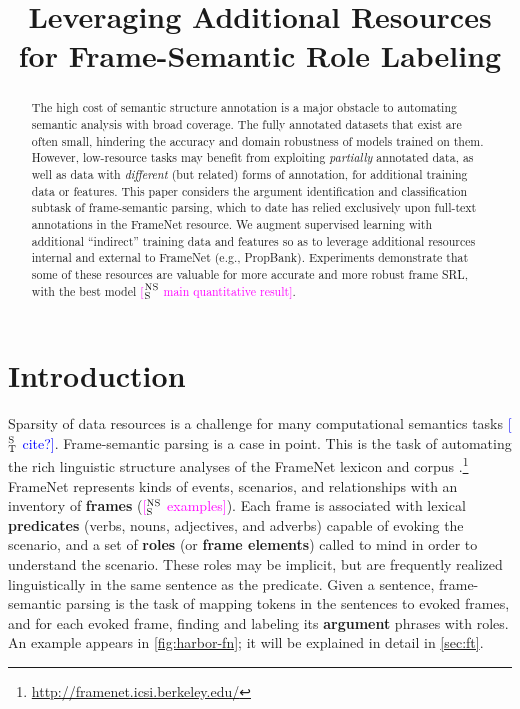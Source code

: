 \documentclass[11pt,a4paper]{article}
\title{Leveraging Additional Resources for Frame-Semantic Role Labeling}
\date{}
\newcommand{\ensuretext}[1]{#1}
\newcommand{\nssmarker}{\ensuretext{\textcolor{magenta}{\ensuremath{^{\textsc{NS}}_{\textsc{S}}}}}}
\newcommand{\stmarker}{\ensuretext{\textcolor{blue}{\ensuremath{^{\textsc{S}}_{\textsc{T}}}}}}
\newcommand{\arkcomment}[3]{\ensuretext{\textcolor{#3}{[#1 #2]}}}
\newcommand{\nss}[1]{\arkcomment{\nssmarker}{#1}{magenta}}
\newcommand{\st}[1]{\arkcomment{\stmarker}{#1}{blue}}
\begin{document}
\maketitle
\begin{abstract}
The high cost of semantic structure annotation is a major obstacle 
to automating semantic analysis with broad coverage.
The fully annotated datasets that exist are often small, 
hindering the accuracy and domain robustness of models trained on them.
However, low-resource tasks may benefit from exploiting \emph{partially} annotated data, 
as well as data with \emph{different} (but related) forms of annotation,
for additional training data or features.
This paper considers the argument identification and classification subtask 
of frame-semantic parsing, which to date has relied exclusively 
upon full-text annotations in the FrameNet resource. %
We augment supervised learning with additional 
``indirect'' training data and features 
so as to leverage additional resources internal and external to FrameNet (e.g., PropBank). 
Experiments demonstrate that some of these resources are valuable for 
more accurate and more robust frame SRL,
with the best model \nss{main quantitative result}.
\end{abstract}

\section{Introduction}

Sparsity of data resources is a challenge for many computational semantics tasks \st{cite?}.
Frame-semantic parsing \citep{das-14} is a case in point.
This is the task of automating the rich linguistic structure analyses 
of the FrameNet lexicon and corpus \citep{baker-98}.\footnote{\url{http://framenet.icsi.berkeley.edu/}}
FrameNet represents kinds of events, scenarios, and relationships 
with an inventory of \textbf{frames} (\nss{examples}). 
Each frame is associated with lexical \textbf{predicates} (verbs, nouns, adjectives, and adverbs) capable of 
evoking the scenario, and a set of \textbf{roles} (or \textbf{frame elements}) 
called to mind in order to understand the scenario. 
These roles may be implicit, 
but are frequently realized linguistically in the same sentence as the predicate.
Given a sentence, frame-semantic parsing is the task of mapping tokens in the sentences
to evoked frames, and for each evoked frame, finding and labeling its \textbf{argument} phrases 
with roles. 
An example appears in \cref{fig:harbor-fn}; it will be explained in detail in \cref{sec:ft}.
\end{document}
